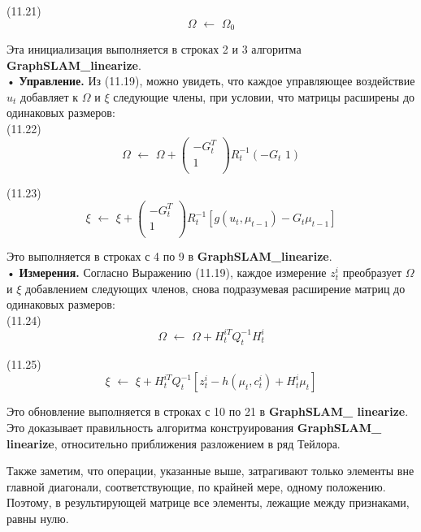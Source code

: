 \documentclass[10pt,a4paper]{article}
\begin{document}
(11.21)
$$\varOmega\,\,\longleftarrow\,\,\varOmega_0$$

Эта инициализация выполняется в строках 2 и 3 алгоритма \textbf{GraphSLAM\_linearize}.\\

•	\textbf{Управление.} Из (11.19), можно увидеть, что каждое управляющее воздействие $u_t$ добавляет к $\varOmega$ и $\xi$ следующие члены, при условии, что матрицы расширены до одинаковых размеров:\\

(11.22)
$$\varOmega\,\,\longleftarrow\,\,\varOmega+\left(\begin{array}{c}-G_t^T\\
1\\
\end{array} \right)R_t^{-1}(-G_t\,\,1)$$

(11.23)
$$\xi\,\,\longleftarrow\,\,\xi+\left(\begin{array}{c}-G_t^T\\
1\\
\end{array} \right)R_t^{-1}[g(u_t,\mu_{t-1})-G_t \mu_{t-1}]$$

Это выполняется в строках с 4 по 9 в \textbf{GraphSLAM\_linearize}.\\

•	\textbf{Измерения.} Согласно Выражению (11.19), каждое измерение $z_t^i$ преобразует $\varOmega$ и $\xi$ добавлением следующих членов, снова подразумевая расширение матриц до одинаковых размеров:\\

(11.24)
$$\varOmega\,\,\longleftarrow\,\,\varOmega+H_t^{iT}Q_t^{-1}H_t^i$$

(11.25)
$$\xi\,\,\longleftarrow\,\,\xi+H_t^{iT}Q_t^{-1}[z_t^i-h(\mu_t,c_t^i)+H_t^i \mu_t]$$

Это обновление выполняется в строках с 10 по 21 в \textbf{GraphSLAM\_ linearize}.\\

Это доказывает правильность алгоритма конструирования \textbf{GraphSLAM\_ linearize}, относительно приближения разложением в ряд Тейлора.

Также заметим, что операции, указанные выше, затрагивают только элементы вне главной диагонали, соответствующие, по крайней мере, одному положению. Поэтому, в результирующей матрице все элементы, лежащие между признаками, равны нулю.
\end{document}
